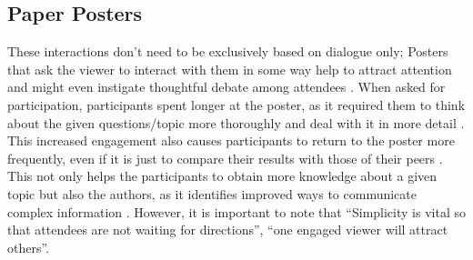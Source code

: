 \subsection{Paper Posters}
These interactions don't need to be exclusively based on dialogue only; Posters that ask the viewer to interact with them in some way help to attract attention and might even instigate thoughtful debate among attendees \cite{Dale}. When asked for participation, participants spent longer at the poster, as it required them to think about the given questions/topic more thoroughly and deal with it in more detail \cite{Dale, Mabrouk}. This increased engagement also causes participants to return to the poster more frequently, even if it is just to compare their results with those of their peers \cite{Dale, Mabrouk}. This not only helps the participants to obtain more knowledge about a given topic but also the authors, as it identifies improved ways to communicate complex information \cite{Dale}. However, it is important to note that \enquote{Simplicity is vital so that attendees are not waiting for directions}\cite{Dale}, \enquote{one engaged viewer will attract others}\cite{Erren}.

